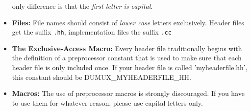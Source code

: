 \begin{itemize}
      only difference is that the \emph{first letter is capital}.
\item \textbf{Files:} File names should consist of \emph{lower case} letters
      exclusively. Header files get the suffix \texttt{.hh}, implementation files the
      suffix \texttt{.cc}
\item \textbf{The Exclusive-Access Macro:} Every header file traditionally begins
      with the definition of a preprocessor constant that is used to make sure that
      each  header file is only included once. If your header file is called
      'myheaderfile.hh', this constant should be DUMUX\_MYHEADERFILE\_HH.
\item \textbf{Macros:} The use of preprocessor macros is strongly discouraged. If you
      have to use them for whatever reason, please use capital letters only.
\end{itemize}
